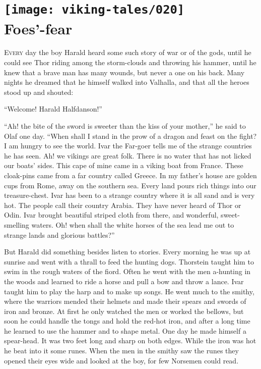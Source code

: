 \chapter[Foes'-fear]{
    \texttt{[image: viking-tales/020]}\\
    Foes'-fear}

\lettrine{E}{very} day the boy Harald heard some such story of war or of
the gods, until he could see Thor riding among the storm-clouds and
throwing his hammer, until he knew that a brave man has many wounds, but
never a one on his back. Many nights he dreamed that he himself walked
into Valhalla, and that all the heroes stood up and shouted:

``Welcome! Harald Halfdanson!''

``Ah! the bite of the sword is sweeter than the kiss of your mother,''
he said to Olaf one day. ``When shall I stand in the prow of a dragon
and feast on the fight? I am hungry to see the world. Ivar the Far-goer
tells me of the strange countries he has seen. Ah! we vikings are great
folk. There is no water that has not licked our boats' sides. This cape
of mine came in a viking boat from France. These cloak-pins came from a
far country called Greece. In my father's house are golden cups from
Rome, away on the southern sea. Every land pours rich things into our
treasure-chest. Ivar has been to a strange country where it is all sand
and is very hot. The people call their country Arabia. They have never
heard of Thor or Odin. Ivar brought beautiful striped cloth from there,
and wonderful, sweet-smelling waters. Oh! when shall the white horses of
the sea lead me out to strange lands and glorious battles?''

But Harald did something besides listen to stories. Every morning he was
up at sunrise and went with a thrall to feed the hunting dogs. Thorstein
taught him to swim in the rough waters of the fiord. Often he went with
the men a-hunting in the woods and learned to ride a horse and pull a
bow and throw a lance. Ivar taught him to play the harp and to make up
songs. He went much to the smithy, where the warriors mended their
helmets and made their spears and swords of iron and bronze. At first he
only watched the men or worked the bellows, but soon he could handle the
tongs and hold the red-hot iron, and after a long time he learned to use
the hammer and to shape metal. One day he made himself a spear-head. It
was two feet long and sharp on both edges. While the iron was hot he
beat into it some runes. When the men in the smithy saw the runes they
opened their eyes wide and looked at the boy, for few Norsemen could
read.

